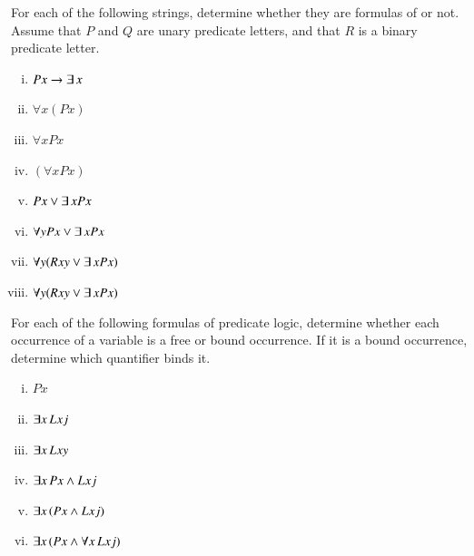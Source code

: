 \documentclass[nobib,nofonts]{tufte-handout}
\newcommand{\predlog}{\acro{PredLog}}
\begin{document}
\bigskip
\noindent \colorbox{mygray}{\centering
  \begin{minipage}{1.0\textwidth}

    \begin{exercise}
      For each of the following strings, determine whether they are formulas of \predlog or not. Assume that $P$ and $Q$ are unary predicate letters, and that $R$ is a binary predicate letter.
      \begin{multicols}{2}
      \begin{enumerate}[(i)]
        \item $Px \rightarrow \exists \thinspace x$
        \item $\forall x (Px)$
        \item $\forall x Px$
        \item $(\forall x Px)$
        \item $Px \vee \exists \thinspace x Px$
        \item $\forall y Px \vee \exists \thinspace x Px$
        \item $\forall y (Rxy \vee \exists \thinspace x Px)$
        \item $\forall y (Rxy \vee \exists \thinspace x Px)$
      \end{enumerate}
    \end{multicols}
    \end{exercise}

    \begin{exercise}
      For each of the following formulas of predicate logic, determine whether each occurrence of a variable is a free or bound occurrence. If it is a bound occurrence, determine which quantifier binds it.
      \begin{multicols}{2}
      \begin{enumerate}[(i)]
        \item $Px$
        \item $\exists x \thinspace Lxj$
        \item $\exists x \thinspace Lxy$
        \item $\exists x \thinspace Px \wedge Lxj$
        \item $\exists x \thinspace (Px \wedge Lxj)$
        \item $\exists x \thinspace (Px \wedge \forall x \thinspace Lxj)$
      \end{enumerate}
    \end{multicols}
    \end{exercise}


\end{minipage}}
\end{document}
